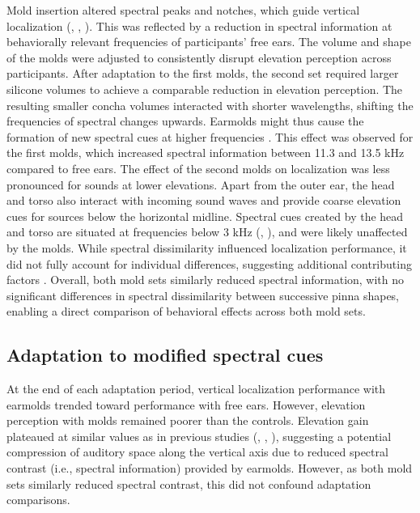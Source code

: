 \documentclass[preprint]{JASA}
\begin{document}
Mold insertion altered spectral peaks and notches, which guide vertical localization (\citet{hofman_spectro-temporal_1998}, \citet{van_wanrooij_relearning_2005}, \citet{trapeau_fast_2016}). This was reflected by a reduction in spectral information at behaviorally relevant frequencies of participants' free ears. The volume and shape of the molds were adjusted to consistently disrupt elevation perception across participants. After adaptation to the first molds, the second set required larger silicone volumes to achieve a comparable reduction in elevation perception. The resulting smaller concha volumes interacted with shorter wavelengths, shifting the frequencies of spectral changes upwards. Earmolds might thus cause the formation of new spectral cues at higher frequencies \citep{van_wanrooij_relearning_2005}. This effect was observed for the first molds, which increased spectral information between 11.3 and 13.5 kHz compared to free ears. The effect of the second molds on localization was less pronounced for sounds at lower elevations. Apart from the outer ear, the head and torso also interact with incoming sound waves and provide coarse elevation cues for sources below the horizontal midline. Spectral cues created by the head and torso are situated at frequencies below 3 kHz (\citet{asano_role_1990}, \citet{algazi_elevation_2001}), and were likely unaffected by the molds. While spectral dissimilarity influenced localization performance, it did not fully account for individual differences, suggesting additional contributing factors \citep{trapeau_fast_2016}. Overall, both mold sets similarly reduced spectral information, with no significant differences in spectral dissimilarity between successive pinna shapes, enabling a direct comparison of behavioral effects across both mold sets.

\subsection{Adaptation to modified spectral cues} 
At the end of each adaptation period, vertical localization performance with earmolds trended toward performance with free ears.
However, elevation perception with molds remained poorer than the controls. Elevation gain plateaued at similar values as in previous studies (\citet{hofman_relearning_1998}, \citet{trapeau_fast_2016}, \citet{trapeau_encoding_2018}), suggesting a potential compression of auditory space along the vertical axis due to reduced spectral contrast (i.e., spectral information) provided by earmolds. However, as both mold sets similarly reduced spectral contrast, this did not confound adaptation comparisons. 
\end{document}
